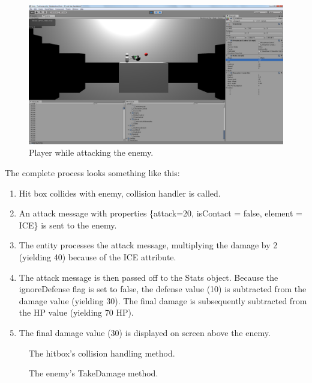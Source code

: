 \documentclass{article}
\begin{document}
\begin{figure}[h!]

\includegraphics[width=5in]{Graphics/During_Hit.png}
\caption{Player while attacking the enemy.}
\label{DuringHit}

\end{figure}

The complete process looks something like this:
\begin{enumerate}

\item Hit box collides with enemy, collision handler is called.
\item An attack message with properties \{attack=20, isContact = false, element = ICE\} is sent to the enemy.
\item The entity processes the attack message, multiplying the damage by 2 (yielding 40) because of the ICE attribute.
\item The attack message is then passed off to the Stats object.  Because the ignoreDefense flag is set to false, the defense value (10) is subtracted from the damage value (yielding 30).  The final damage is subsequently subtracted from the HP value (yielding 70 HP).
\item The final damage value (30) is displayed on screen  above the enemy.

\end{enumerate}



\begin{figure}[htbp]
	
	\caption{The hitbox's collision handling method.}
	\label{CollideHandler}
\end{figure}

\begin{figure}[htbp]
	
	\caption{The enemy's TakeDamage method.}
	\label{TakeDamage}
\end{figure}
\end{document}
